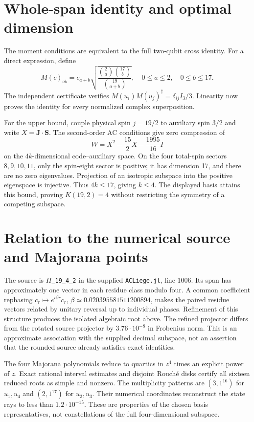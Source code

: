 \documentclass[11pt]{article}
\begin{document}
\section{Whole-span identity and optimal dimension}
The moment conditions are equivalent to the full two-qubit cross identity.
For a direct expression, define
\[
M(c)_{ab}=c_{a+b}\sqrt{\frac{\binom2a\binom{17}b}{\binom{19}{a+b}}},
\quad0\le a\le2,\quad0\le b\le17.
\]
The independent certificate verifies $M(u_i)M(u_j)^\dagger=\delta_{ij}I_3/3$.
Linearity now proves the identity for every normalized complex superposition.

For the upper bound, couple physical spin $j=19/2$ to auxiliary spin $3/2$ and
write $X=\mathbf J\cdot\mathbf S$. The second-order AC conditions give zero
compression of
\[
W=X^2-\frac{15}{2}X-\frac{1995}{16}I
\]
on the $4k$-dimensional code--auxiliary space. On the four total-spin sectors
$8,9,10,11$, only the spin-eight sector is positive; it has dimension 17, and
there are no zero eigenvalues. Projection of an isotropic subspace into the
positive eigenspace is injective. Thus $4k\le17$, giving $k\le4$.
The displayed basis attains this bound, proving $K(19,2)=4$ without restricting
the symmetry of a competing subspace.

\section{Relation to the numerical source and Majorana points}
The source is \texttt{\(\Pi\)\_19\_4\_2} in the supplied \texttt{ACLiege.jl},
line 1006. Its span has approximately one vector in each residue class modulo
four. A common coefficient rephasing $c_r\mapsto e^{i\beta r}c_r$,
$\beta\simeq0.020395581511200894$, makes the paired residue vectors related by
unitary reversal up to individual phases. Refinement of this structure produces
the isolated algebraic root above. The refined projector differs from the
rotated source projector by $3.76\cdot10^{-8}$ in Frobenius norm. This is an
approximate association with the supplied decimal subspace, not an assertion
that the rounded source already satisfies exact identities.

The four Majorana polynomials reduce to quartics in $z^4$ times an explicit
power of $z$. Exact rational interval estimates and disjoint Rouch\'e disks
certify all sixteen reduced roots as simple and nonzero. The multiplicity
patterns are $(3,1^{16})$ for $u_1,u_4$ and $(2,1^{17})$ for $u_2,u_3$.
Their numerical coordinates reconstruct the state rays to less than
$1.2\cdot10^{-15}$. These are properties of the chosen basis representatives,
not constellations of the full four-dimensional subspace.
\end{document}
